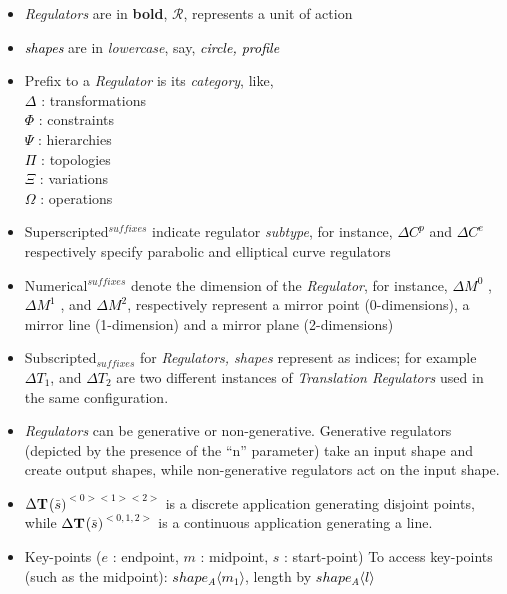\begin{itemize}%
[noitemsep,topsep=2pt,parsep=2pt,partopsep=2pt]

	\item {\em Regulators} are in {\bf bold}, {\bf  $\mathcal{R}$}, represents a unit of action
	\item \textcolor{black}{\em shapes} are in {\em lowercase}, say, \textcolor{black}{\em circle, profile}
	\item Prefix to a  {\em Regulator} is its {\em category}, like, \\
		 \textcolor{black}{$\Delta$}	 :  transformations  \\
		 \textcolor{black}{$\Phi$} 	 :  constraints  \\
		 \textcolor{black}{$\Psi$}		 :  hierarchies  \\
		 \textcolor{black}{$\Pi$}		 :  topologies  \\
		 \textcolor{black}{$\Xi$}		 : variations  \\
		 \textcolor{black}{$\Omega$}  :  operations

	\item Superscripted$^{suffixes}$  indicate  regulator  {\em subtype},  for instance, \textcolor{black}{$\Delta C^p$} and  \textcolor{black}{$\Delta C^e$}  respectively specify parabolic and elliptical curve regulators

	\item Numerical$^{suffixes}$ denote the dimension of the {\em Regulator}, for instance, \textcolor{black}{$\Delta M^0$} ,   \textcolor{black}{$\Delta M^1$ }, and   \textcolor{black}{$\Delta M^2$}, respectively represent a mirror point (0-dimensions), a mirror line (1-dimension) and a mirror plane (2-dimensions)

	\item  Subscripted$_{suffixes}$ for {\em Regulators,  shapes} represent  as  indices;  for  example  \textcolor{black}{$\Delta T_1$},  and  \textcolor{black}{$\Delta T_2$} are  two different instances of {\em Translation Regulators} used in the same configuration.

	\item {\em Regulators} can be generative or non-generative.  Generative  regulators (depicted by the presence of the ``n'' parameter)  take  an  input  shape  and  create output  shapes,  while  non-generative  regulators  act  on  the  input  shape.

	\item \textcolor{black}{$\Delta {\bf T}$}\textcolor{black}{($\bar{s})^{<0><1><2>}$}  is  a  discrete  application  generating disjoint points, while  \textcolor{black}{$\Delta  {\bf T}$}\textcolor{black}{($\bar{s})^{<0,1,2>}$}  is a continuous application generating a line.  

	\item Key-points ($ e$ : endpoint,   $m$ : midpoint,   $s$ : start-point) To access key-points (such as the midpoint): \textcolor{black}{$ shape_A \langle m_1 \rangle$}, length by \textcolor{black}{$shape_A \langle l \rangle$}
\end{itemize}

